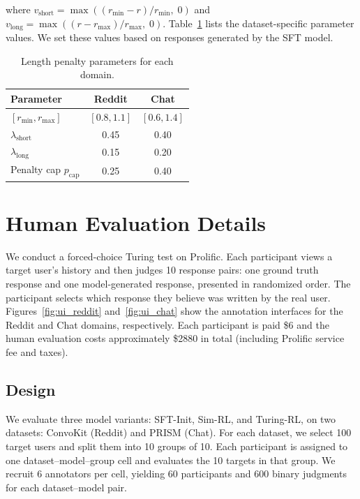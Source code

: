 \documentclass{article} %
\begin{document}
where $v_{\mathrm{short}} = \max((r_{\min} - r) / r_{\min},\; 0)$ and $v_{\mathrm{long}} = \max((r - r_{\max}) / r_{\max},\; 0)$. Table~\ref{tab:reward-shaping} lists the dataset-specific parameter values. We set these values based on responses generated by the SFT model.

\begin{table}[h]
\centering
\small
\begin{tabular}{lcc}
\toprule
\textbf{Parameter} & \textbf{Reddit} & \textbf{Chat} \\
\midrule
$[r_{\min}, r_{\max}]$ & $[0.8, 1.1]$ & $[0.6, 1.4]$ \\
$\lambda_{\mathrm{short}}$ & 0.45 & 0.40 \\
$\lambda_{\mathrm{long}}$ & 0.15 & 0.20 \\
Penalty cap $p_{\mathrm{cap}}$ & 0.25 & 0.40 \\
\bottomrule
\end{tabular}
\caption{Length penalty parameters for each domain.}
\label{tab:reward-shaping}
\end{table}


\section{Human Evaluation Details}
\label{app:human-eval}

We conduct a forced-choice Turing test on Prolific. Each participant views a target user's history and then judges 10 response pairs: one ground truth response and one model-generated response, presented in randomized order. The participant selects which response they believe was written by the real user. Figures~\ref{fig:ui_reddit} and~\ref{fig:ui_chat} show the annotation interfaces for the Reddit and Chat domains, respectively. Each participant is paid \$6 and the human evaluation costs approximately \$2880 in total (including Prolific service fee and taxes). 

\subsection{Design}
We evaluate three model variants: SFT-Init, Sim-RL, and Turing-RL, on two datasets: ConvoKit (Reddit) and PRISM (Chat). For each dataset, we select 100 target users and split them into 10 groups of 10. Each participant is assigned to one dataset--model--group cell and evaluates the 10 targets in that group. We recruit 6 annotators per cell, yielding 60 participants and 600 binary judgments for each dataset--model pair.
\end{document}
